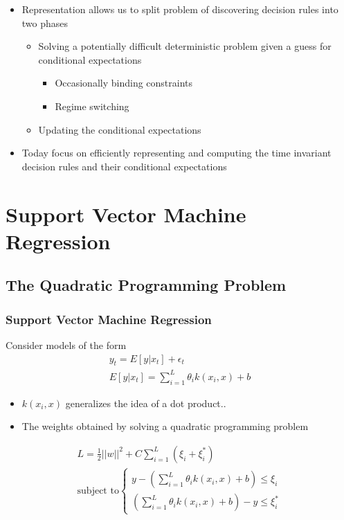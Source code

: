 \documentclass[tikz]{beamer}
\begin{document}
\begin{frame}
     \begin{itemize}
   \item Representation allows us to split problem of discovering decision rules into two phases
     \begin{itemize}
     \item Solving a potentially difficult deterministic problem given a guess for conditional expectations
       \begin{itemize}
     \item Occasionally binding constraints
     \item Regime switching
       \end{itemize}
     \item Updating the conditional expectations
   \end{itemize}
   \item Today focus on efficiently representing and computing the time invariant decision rules and their conditional expectations
\end{itemize}


\end{frame}



\section{Support Vector Machine Regression}
\subsection{The Quadratic Programming Problem}

\begin{frame}
  \frametitle{Support Vector Machine Regression}
{\small

Consider models of the form 
\begin{gather}
y_t=E[y|x_t]+ \epsilon_t\\
E[y|x_t]= \sum_{i=1}^L\theta_ik(x_i,x)+b
\end{gather}
\begin{itemize}
\item $k(x_i,x)$ generalizes the idea of a dot product.\cite{hofmann06kernelreview}.
\item The weights obtained by solving a quadratic programming problem
\end{itemize}
\begin{gather}
L=\frac{1}{2}||w||^2 + C \sum_{i=1}^L (\xi_i+\xi_i^\ast) \\
  \text{subject to}
\begin{cases}
  y-( \sum_{i=1}^L\theta_ik(x_i,x)+b) \le \xi_i\\
 ( \sum_{i=1}^L\theta_ik(x_i,x)+b )-y \le \xi_i^\ast
\end{cases}
\end{gather}
}
\end{frame}
\end{document}

